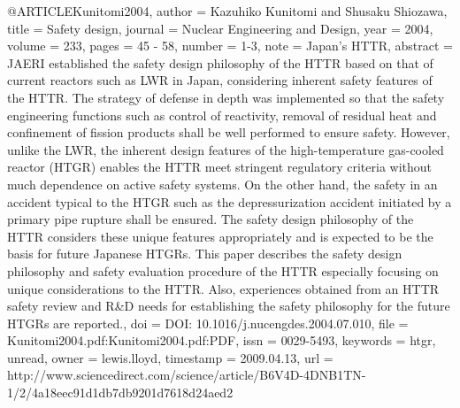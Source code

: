 {@ARTICLE{Kunitomi2004,
  author = {Kazuhiko Kunitomi and Shusaku Shiozawa},
  title = {Safety design},
  journal = {Nuclear Engineering and Design},
  year = {2004},
  volume = {233},
  pages = {45 - 58},
  number = {1-3},
  note = {Japan's HTTR},
  abstract = {JAERI established the safety design philosophy of the HTTR based on
	that of current reactors such as LWR in Japan, considering inherent
	safety features of the HTTR. The strategy of defense in depth was
	implemented so that the safety engineering functions such as control
	of reactivity, removal of residual heat and confinement of fission
	products shall be well performed to ensure safety. However, unlike
	the LWR, the inherent design features of the high-temperature gas-cooled
	reactor (HTGR) enables the HTTR meet stringent regulatory criteria
	without much dependence on active safety systems. On the other hand,
	the safety in an accident typical to the HTGR such as the depressurization
	accident initiated by a primary pipe rupture shall be ensured. The
	safety design philosophy of the HTTR considers these unique features
	appropriately and is expected to be the basis for future Japanese
	HTGRs. This paper describes the safety design philosophy and safety
	evaluation procedure of the HTTR especially focusing on unique considerations
	to the HTTR. Also, experiences obtained from an HTTR safety review
	and R&D needs for establishing the safety philosophy for the future
	HTGRs are reported.},
  doi = {DOI: 10.1016/j.nucengdes.2004.07.010},
  file = {Kunitomi2004.pdf:Kunitomi2004.pdf:PDF},
  issn = {0029-5493},
  keywords = {htgr, unread},
  owner = {lewis.lloyd},
  timestamp = {2009.04.13},
  url = {http://www.sciencedirect.com/science/article/B6V4D-4DNB1TN-1/2/4a18eec91d1db7db9201d7618d24aed2}
}

}

